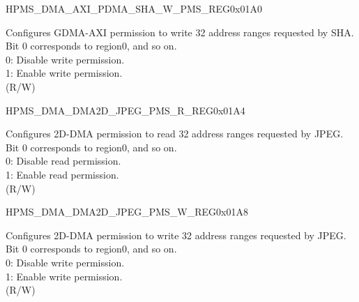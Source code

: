 \begin{register}{H}{PMS\_DMA\_AXI\_PDMA\_SHA\_W\_PMS\_REG}{0x01A0}\label{regdesc:PMSDMAAXIPDMASHAWPMSREG}
%
\regnewline%
\begin{regdesc}\begin{reglist}
\label{fielddesc:PMSDMAAXIPDMASHAWPMS}\item [PMS\_DMA\_AXI\_PDMA\_SHA\_W\_PMS] Configures GDMA-AXI permission to write 32 address ranges requested by SHA. Bit 0 corresponds to region0, and so on.\\
0: Disable write permission.\\
1: Enable write permission.\\ (R/W)
\end{reglist}\end{regdesc}
\end{register}


\begin{register}{H}{PMS\_DMA\_DMA2D\_JPEG\_PMS\_R\_REG}{0x01A4}\label{regdesc:PMSDMADMA2DJPEGPMSRREG}
%
\regnewline%
\begin{regdesc}\begin{reglist}
\label{fielddesc:PMSDMADMA2DJPEGRPMS}\item [PMS\_DMA\_DMA2D\_JPEG\_R\_PMS] Configures 2D-DMA permission to read 32 address ranges requested by JPEG. Bit 0 corresponds to region0, and so on.\\
0: Disable read permission.\\
1: Enable read permission.\\ (R/W)
\end{reglist}\end{regdesc}
\end{register}


\begin{register}{H}{PMS\_DMA\_DMA2D\_JPEG\_PMS\_W\_REG}{0x01A8}\label{regdesc:PMSDMADMA2DJPEGPMSWREG}
%
\regnewline%
\begin{regdesc}\begin{reglist}
\label{fielddesc:PMSDMADMA2DJPEGWPMS}\item [PMS\_DMA\_DMA2D\_JPEG\_W\_PMS] Configures 2D-DMA permission to write 32 address ranges requested by JPEG. Bit 0 corresponds to region0, and so on.\\
0: Disable write permission.\\
1: Enable write permission.\\ (R/W)
\end{reglist}\end{regdesc}
\end{register}


